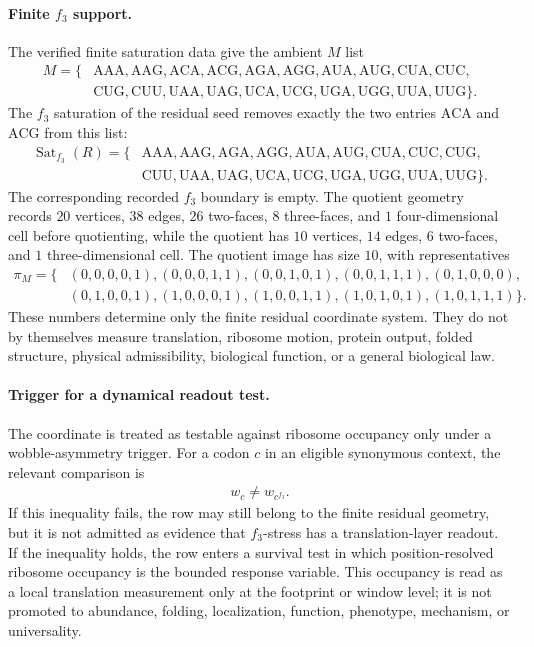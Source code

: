 \paragraph{Finite $f_3$ support.}
The verified finite saturation data give the ambient $M$ list
$$
\begin{aligned}
M=\{&\mathrm{AAA},\mathrm{AAG},\mathrm{ACA},\mathrm{ACG},\mathrm{AGA},\mathrm{AGG},\mathrm{AUA},\mathrm{AUG},\mathrm{CUA},\mathrm{CUC},\\
&\mathrm{CUG},\mathrm{CUU},\mathrm{UAA},\mathrm{UAG},\mathrm{UCA},\mathrm{UCG},\mathrm{UGA},\mathrm{UGG},\mathrm{UUA},\mathrm{UUG}\}.
\end{aligned}
$$
The $f_3$ saturation of the residual seed removes exactly the two entries $\mathrm{ACA}$ and $\mathrm{ACG}$ from this list:
$$
\begin{aligned}
\operatorname{Sat}_{f_3}(R)=\{&\mathrm{AAA},\mathrm{AAG},\mathrm{AGA},\mathrm{AGG},\mathrm{AUA},\mathrm{AUG},\mathrm{CUA},\mathrm{CUC},\mathrm{CUG},\\
&\mathrm{CUU},\mathrm{UAA},\mathrm{UAG},\mathrm{UCA},\mathrm{UCG},\mathrm{UGA},\mathrm{UGG},\mathrm{UUA},\mathrm{UUG}\}.
\end{aligned}
$$
The corresponding recorded $f_3$ boundary is empty.  The quotient geometry records $20$ vertices, $38$ edges, $26$ two-faces, $8$ three-faces, and $1$ four-dimensional cell before quotienting, while the quotient has $10$ vertices, $14$ edges, $6$ two-faces, and $1$ three-dimensional cell.  The quotient image has size $10$, with representatives
$$
\begin{aligned}
\pi_M=\{&(0,0,0,0,1),(0,0,0,1,1),(0,0,1,0,1),(0,0,1,1,1),(0,1,0,0,0),\\
&(0,1,0,0,1),(1,0,0,0,1),(1,0,0,1,1),(1,0,1,0,1),(1,0,1,1,1)\}.
\end{aligned}
$$
These numbers determine only the finite residual coordinate system.  They do not by themselves measure translation, ribosome motion, protein output, folded structure, physical admissibility, biological function, or a general biological law.

\paragraph{Trigger for a dynamical readout test.}
The coordinate is treated as testable against ribosome occupancy only under a wobble-asymmetry trigger.  For a codon $c$ in an eligible synonymous context, the relevant comparison is
$$
\begin{aligned}
w_c \neq w_{c^{f_3}}.
\end{aligned}
$$
If this inequality fails, the row may still belong to the finite residual geometry, but it is not admitted as evidence that $f_3$-stress has a translation-layer readout.  If the inequality holds, the row enters a survival test in which position-resolved ribosome occupancy is the bounded response variable.  This occupancy is read as a local translation measurement only at the footprint or window level; it is not promoted to abundance, folding, localization, function, phenotype, mechanism, or universality.

